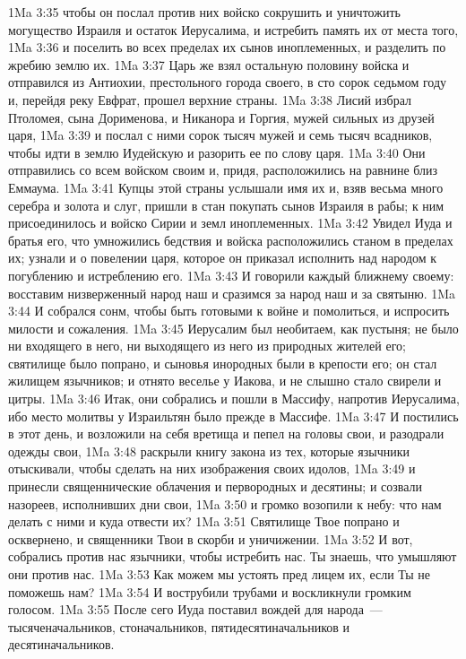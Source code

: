 \vs 1Ma 3:35 чтобы он послал против них войско сокрушить и уничтожить могущество Израиля и остаток Иерусалима, и истребить память их от места того,
\vs 1Ma 3:36 и поселить во всех пределах их сынов иноплеменных, и разделить по жребию землю их.
\vs 1Ma 3:37 Царь же взял остальную половину войска и отправился из Антиохии, престольного города своего, в сто сорок седьмом году и, перейдя реку Евфрат, прошел верхние страны.
\vs 1Ma 3:38 Лисий избрал Птоломея, сына Дорименова, и Никанора и Горгия, мужей сильных из друзей царя,
\vs 1Ma 3:39 и послал с ними сорок тысяч мужей и семь тысяч всадников, чтобы идти в землю Иудейскую и разорить ее по слову царя.
\vs 1Ma 3:40 Они отправились со всем войском своим и, придя, расположились на равнине близ Еммаума.
\vs 1Ma 3:41 Купцы этой страны услышали имя их и, взяв весьма много серебра и золота и слуг, пришли в стан покупать сынов Израиля в рабы; к ним присоединилось и войско Сирии и земл иноплеменных.
\rsbpar\vs 1Ma 3:42 Увидел Иуда и братья его, что умножились бедствия и войска расположились станом в пределах их; узнали и о повелении царя, которое он приказал исполнить над народом к погублению и истреблению его.
\vs 1Ma 3:43 И говорили каждый ближнему своему: восставим низверженный народ наш и сразимся за народ наш и за святыню.
\vs 1Ma 3:44 И собрался сонм, чтобы быть готовыми к войне и помолиться, и испросить милости и сожаления.
\vs 1Ma 3:45 Иерусалим был необитаем, как пустыня; не было ни входящего в него, ни выходящего из него из природных жителей его; святилище было попрано, и сыновья инородных были в крепости его; он стал жилищем язычников; и отнято веселье у Иакова, и не слышно стало свирели и цитры.
\vs 1Ma 3:46 Итак, они собрались и пошли в Массифу, напротив Иерусалима, ибо место молитвы у Израильтян было прежде в Массифе.
\vs 1Ma 3:47 И постились в этот день, и возложили на себя вретища и пепел на головы свои, и разодрали одежды свои,
\vs 1Ma 3:48 раскрыли книгу закона из тех, которые язычники отыскивали, чтобы сделать на них изображения своих идолов,
\vs 1Ma 3:49 и принесли священнические облачения и первородных и десятины; и созвали назореев, исполнивших дни свои,
\vs 1Ma 3:50 и громко возопили к небу: что нам делать с ними и куда отвести их?
\vs 1Ma 3:51 Святилище Твое попрано и осквернено, и священники Твои в скорби и уничижении.
\vs 1Ma 3:52 И вот, собрались против нас язычники, чтобы истребить нас. Ты знаешь, что умышляют они против нас.
\vs 1Ma 3:53 Как можем мы устоять пред лицем их, если Ты не поможешь нам?
\vs 1Ma 3:54 И вострубили трубами и воскликнули громким голосом.
\rsbpar\vs 1Ma 3:55 После сего Иуда поставил вождей для народа~--- тысяченачальников, стоначальников, пятидесятиначальников и десятиначальников.
